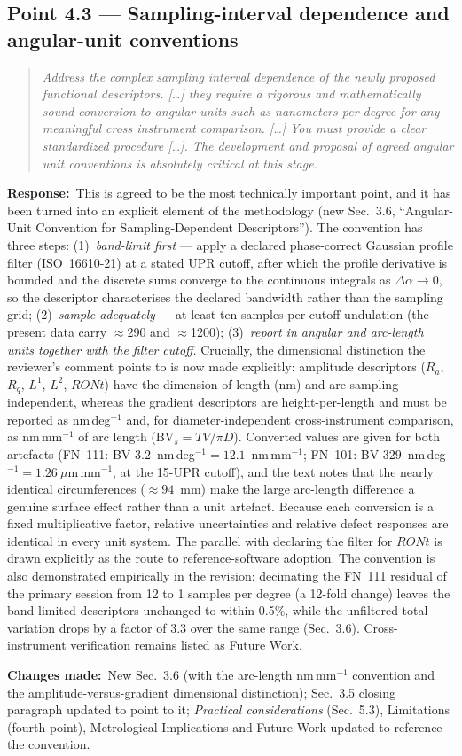 \documentclass[11pt,a4paper]{article}
\newenvironment{reviewercomment}%
{\par\medskip\noindent\begin{quotation}\itshape\color{black!70}}%
{\end{quotation}\medskip}
\newcommand{\response}{\par\noindent\textbf{Response:}\ }
\newcommand{\changes}{\par\noindent\textbf{Changes made:}\ }
\begin{document}
\subsection*{Point 4.3 --- Sampling-interval dependence and angular-unit conventions}
\begin{reviewercomment}
Address the complex sampling interval dependence of the newly proposed functional descriptors. [\ldots] they require a rigorous and mathematically sound conversion to angular units such as nanometers per degree for any meaningful cross instrument comparison. [\ldots] You must provide a clear standardized procedure [\ldots]. The development and proposal of agreed angular unit conventions is absolutely critical at this stage.
\end{reviewercomment}
\response This is agreed to be the most technically important point, and it has been turned into an explicit element of the methodology (new Sec.~3.6, ``Angular-Unit Convention for Sampling-Dependent Descriptors''). The convention has three steps: (1)~\emph{band-limit first} --- apply a declared phase-correct Gaussian profile filter (ISO~16610-21) at a stated UPR cutoff, after which the profile derivative is bounded and the discrete sums converge to the continuous integrals as $\Delta\alpha\to0$, so the descriptor characterises the declared bandwidth rather than the sampling grid; (2)~\emph{sample adequately} --- at least ten samples per cutoff undulation (the present data carry $\approx$290 and $\approx$1200); (3)~\emph{report in angular and arc-length units together with the filter cutoff}. Crucially, the dimensional distinction the reviewer's comment points to is now made explicitly: amplitude descriptors ($R_a$, $R_q$, $L^1$, $L^2$, $RONt$) have the dimension of length (nm) and are sampling-independent, whereas the gradient descriptors are height-per-length and must be reported as nm\,deg$^{-1}$ and, for diameter-independent cross-instrument comparison, as nm\,mm$^{-1}$ of arc length ($\mathrm{BV}_s=TV/\pi D$). Converted values are given for both artefacts (FN~111: BV $3.2$~nm\,deg$^{-1}=12.1$~nm\,mm$^{-1}$; FN~101: BV $329$~nm\,deg$^{-1}=1.26~\mu$m\,mm$^{-1}$, at the 15-UPR cutoff), and the text notes that the nearly identical circumferences ($\approx94$~mm) make the large arc-length difference a genuine surface effect rather than a unit artefact. Because each conversion is a fixed multiplicative factor, relative uncertainties and relative defect responses are identical in every unit system. The parallel with declaring the filter for $RONt$ is drawn explicitly as the route to reference-software adoption. The convention is also demonstrated empirically in the revision: decimating the FN~111 residual of the primary session from 12 to 1 samples per degree (a 12-fold change) leaves the band-limited descriptors unchanged to within 0.5\%, while the unfiltered total variation drops by a factor of 3.3 over the same range (Sec.~3.6). Cross-instrument verification remains listed as Future Work.
\changes New Sec.~3.6 (with the arc-length nm\,mm$^{-1}$ convention and the amplitude-versus-gradient dimensional distinction); Sec.~3.5 closing paragraph updated to point to it; \emph{Practical considerations} (Sec.~5.3), Limitations (fourth point), Metrological Implications and Future Work updated to reference the convention.
\end{document}
